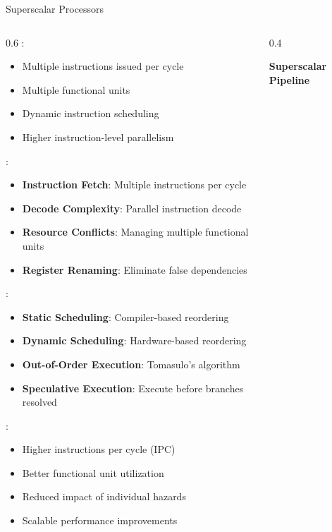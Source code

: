 \begin{frame}{Superscalar Processors}
\begin{columns}
\begin{column}{0.6\textwidth}
:
\begin{itemize}
\item Multiple instructions issued per cycle
\item Multiple functional units
\item Dynamic instruction scheduling
\item Higher instruction-level parallelism
\end{itemize}

\vspace{0.3cm}
:
\begin{itemize}
\item \textbf{Instruction Fetch}: Multiple instructions per cycle
\item \textbf{Decode Complexity}: Parallel instruction decode
\item \textbf{Resource Conflicts}: Managing multiple functional units
\item \textbf{Register Renaming}: Eliminate false dependencies
\end{itemize}

\vspace{0.3cm}
:
\begin{itemize}
\item \textbf{Static Scheduling}: Compiler-based reordering
\item \textbf{Dynamic Scheduling}: Hardware-based reordering
\item \textbf{Out-of-Order Execution}: Tomasulo's algorithm
\item \textbf{Speculative Execution}: Execute before branches resolved
\end{itemize}

\vspace{0.3cm}
:
\begin{itemize}
\item Higher instructions per cycle (IPC)
\item Better functional unit utilization
\item Reduced impact of individual hazards
\item Scalable performance improvements
\end{itemize}
\end{column}
\begin{column}{0.4\textwidth}
\begin{center}
\textbf{Superscalar Pipeline}
\vspace{0.3cm}


\end{center}
\end{column}
\end{columns}
\end{frame}
